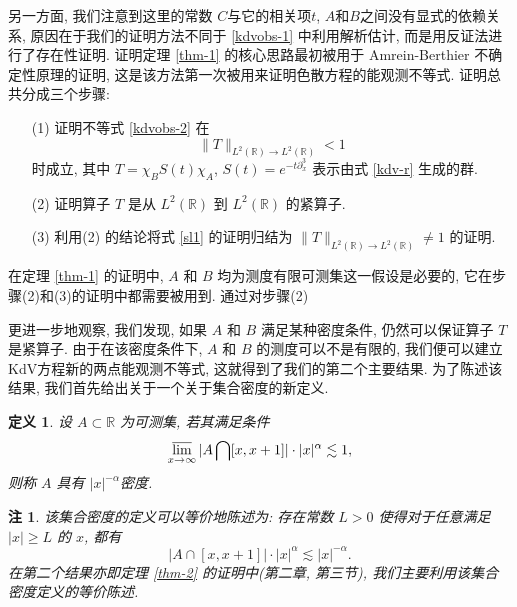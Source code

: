 \documentclass[master]{cugthesis}
\newcommand\R{\ensuremath{\mathbb{R}}}
\newtheorem{remark}{注}
\newtheorem{definition}{定义}[chapter]
\begin{document}
    另一方面, 我们注意到这里的常数 $C$与它的相关项$t$, $A$和$B$之间没有显式的依赖关系, 原因在于我们的证明方法不同于 \eqref{kdvobs-1} 中利用解析估计, 而是用反证法进行了存在性证明. 证明定理 \ref{thm-1} 的核心思路最初\cite{Amrein1977OnSP}被用于 Amrein-Berthier 不确定性原理的证明, 这是该方法第一次被用来证明色散方程的能观测不等式. 证明总共分成三个步骤:
    \begin{enumerate}
        \item[(1)] 证明不等式 \eqref{kdvobs-2} 在
        \begin{equation}
            \|T\|_{L^{2}(\R)\to L^2(\R)}<1\label{sl1}
        \end{equation}
        时成立, 其中 $T=\chi_BS(t)\chi_A$, $S(t)=e^{-t\partial_x^3}$ 表示由式 \eqref{kdv-r} 生成的群.
        \item[(2)] 证明算子 $T$ 是从 $L^2(\R)$ 到 $L^2(\R)$ 的紧算子.
        \item[(3)] 利用(2) 的结论将式 \eqref{sl1} 的证明归结为 $\| T\|_{L^2(\R)\to L^2(\R)}\neq 1$ 的证明.
    \end{enumerate}
    
    在定理 \ref{thm-1} 的证明中, $A$ 和 $B$ 均为测度有限可测集这一假设是必要的, 它在步骤(2)和(3)的证明中都需要被用到. 通过对步骤(2) 
    
    更进一步地观察, 我们发现, 如果 $A$ 和 $B$ 满足某种密度条件, 仍然可以保证算子 $T$ 是紧算子. 由于在该密度条件下, $A$ 和 $B$ 的测度可以不是有限的, 我们便可以建立KdV方程新的两点能观测不等式, 这就得到了我们的第二个主要结果. 为了陈述该结果, 我们首先给出关于一个关于集合密度的新定义.
    \begin{definition}
    设 $A\subset \R$ 为可测集, 若其满足条件
    \begin{equation*}
         \varlimsup_{x\to \infty}|A\bigcap[x,x+1]|\cdot|x|^{\alpha}\lesssim 1,
    \end{equation*}
    则称 $A$ 具有 $|x|^{-\alpha}$密度.
    \end{definition}
    \begin{remark}\label{rem-1}
    该集合密度的定义可以等价地陈述为: 存在常数 $L>0$ 使得对于任意满足 $|x|\ge L$ 的 $x$, 都有
    \begin{equation*}
        |A\cap [x,x+1]|\cdot |x|^\alpha\lesssim |x|^{-\alpha}.
     \end{equation*}
    在第二个结果亦即定理 \ref{thm-2} 的证明中(第二章, 第三节), 我们主要利用该集合密度定义的等价陈述.
    \end{remark}
    
\end{document}

